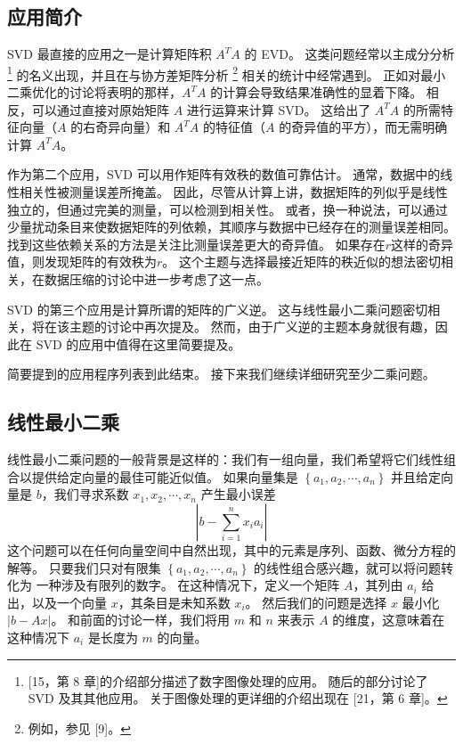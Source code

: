\documentclass[11pt,a4paper,twoside]{article}
\begin{document}
\begin{CJK}{UTF8}{gbsn}
\subsection{应用简介}
SVD 最直接的应用之一是计算矩阵积 $A^{T} A$ 的 EVD。 这类问题经常以主成分分析\footnote{[15，第 8 章]的介绍部分描述了数字图像处理的应用。 随后的部分讨论了 SVD 及其其他应用。 关于图像处理的更详细的介绍出现在 [21，第 6 章]。} 的名义出现，并且在与协方差矩阵分析 \footnote{例如，参见 [9]。} 相关的统计中经常遇到。 正如对最小二乘优化的讨论将表明的那样，$A^{T}A$ 的计算会导致结果准确性的显着下降。 相反，可以通过直接对原始矩阵 $A$ 进行运算来计算 SVD。 这给出了 $A^{T} A$ 的所需特征向量（$A$ 的右奇异向量）和 $A^{T} A$ 的特征值（$A$ 的奇异值的平方），而无需明确 计算 $A^{T} A$。

作为第二个应用，SVD 可以用作矩阵有效秩的数值可靠估计。 通常，数据中的线性相关性被测量误差所掩盖。 因此，尽管从计算上讲，数据矩阵的列似乎是线性独立的，但通过完美的测量，可以检测到相关性。 或者，换一种说法，可以通过少量扰动条目来使数据矩阵的列依赖，其顺序与数据中已经存在的测量误差相同。 找到这些依赖关系的方法是关注比测量误差更大的奇异值。 如果存在$r$这样的奇异值，则发现矩阵的有效秩为$r$。 这个主题与选择最接近矩阵的秩近似的想法密切相关，在数据压缩的讨论中进一步考虑了这一点。

SVD 的第三个应用是计算所谓的矩阵的广义逆。 这与线性最小二乘问题密切相关，将在该主题的讨论中再次提及。 然而，由于广义逆的主题本身就很有趣，因此在 SVD 的应用中值得在这里简要提及。

简要提到的应用程序列表到此结束。 接下来我们继续详细研究至少二乘问题。

\subsection{线性最小二乘}
线性最小二乘问题的一般背景是这样的：我们有一组向量，我们希望将它们线性组合以提供给定向量的最佳可能近似值。 如果向量集是 $\left\{a_{1}, a_{2}, \cdots, a_{n}\right\}$ 并且给定向量是 $b$，我们寻求系数 $x_{1} , x_{2}, \cdots, x_{n}$ 产生最小误差
$$
\left|b-\sum_{i=1}^{n} x_{i} a_{i}\right|
$$
这个问题可以在任何向量空间中自然出现，其中的元素是序列、函数、微分方程的解等。 只要我们只对有限集 $\left\{a_{1}, a_{2}, \cdots, a_{n}\right\}$ 的线性组合感兴趣，就可以将问题转化为 一种涉及有限列的数字。 在这种情况下，定义一个矩阵 $A$，其列由 $a_{i}$ 给出，以及一个向量 $x$，其条目是未知系数 $x_{i}$。 然后我们的问题是选择 $x$ 最小化 $|b-A x|$。 和前面的讨论一样，我们将用 $m$ 和 $n$ 来表示 $A$ 的维度，这意味着在这种情况下 $a_{i}$ 是长度为 $m$ 的向量。


\end{CJK}
\end{document}
